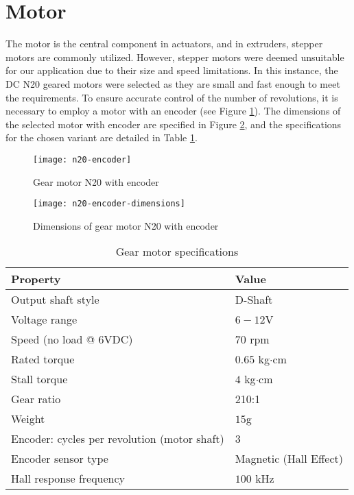 \section{Motor}

The motor is the central component in actuators, and in extruders, stepper motors are commonly utilized. However, stepper motors were deemed unsuitable for our application due to their size and speed limitations. In this instance, the DC N20 geared motors were selected as they are small and fast enough to meet the requirements. To ensure accurate control of the number of revolutions, it is necessary to employ a motor with an encoder (see Figure \ref{fig:n20-encoder}). The dimensions of the selected motor with encoder are specified in Figure \ref{fig:n20-encoder-dimensions}, and the specifications for the chosen variant are detailed in Table \ref{tab:motor-specs}.

\begin{figure}[H]
    \centering
    \texttt{[image: n20-encoder]}
    \caption{Gear motor N20 with encoder}
    \label{fig:n20-encoder}
\end{figure}

\begin{figure}[H]
    \centering
    \texttt{[image: n20-encoder-dimensions]}
    \caption{Dimensions of gear motor N20 with encoder}
    \label{fig:n20-encoder-dimensions}
\end{figure}


\begin{table}[H]
    \centering
    \caption{Gear motor specifications}
    \label{tab:motor-specs}
    \begin{tabular}{@{}ll@{}}
    \toprule
    Property                                     & Value                  \\
    \midrule
    Output shaft style                           & D-Shaft                \\
    Voltage range                                & $6-12$V                \\
    Speed (no load @ 6VDC)                       & $70$ rpm               \\
    Rated torque                                 & $0.65$ kg$\cdot$cm            \\
    Stall torque                                 & $4$ kg$\cdot$cm               \\
    Gear ratio                                   & 210:1                  \\
    Weight                                       & $15$g                  \\
    Encoder: cycles per revolution (motor shaft) & 3                      \\
    Encoder sensor type                          & Magnetic (Hall Effect) \\
    Hall response frequency                      & $100$ kHz              \\
    \bottomrule
    \end{tabular}
\end{table}

